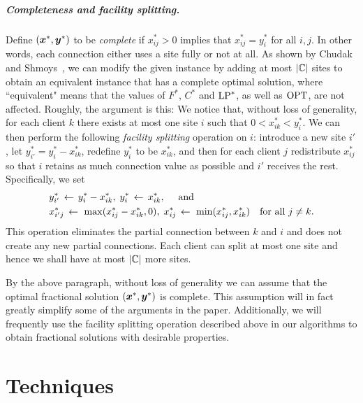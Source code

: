 \documentclass[oneside,final]{ucr}
\begin{document}
\paragraph{Completeness and facility splitting.}
Define $(\boldsymbol{x}^\ast, \boldsymbol{y}^\ast)$ to be \emph{complete} if
$x_{ij}^\ast>0$ implies that $x_{ij}^\ast=y_i^\ast$ for all $i,j$. In
other words, each connection either uses a site fully or not at all.
As shown by Chudak and Shmoys~\cite{ChudakS04}, we can modify the
given instance by adding at most $|\mathbb{C}|$ sites to obtain an
equivalent instance that has a complete optimal solution, where
``equivalent" means that the values of $F^\ast$, $C^\ast$ and
$\mbox{\rm LP}^\ast$, as well as $\mbox{\rm OPT}$, are not affected. Roughly, the argument
is this: We notice that, without loss of generality, for each client
$k$ there exists at most one site $i$ such that $0 < x_{ik}^\ast <
y_i^\ast$.  We can then perform the following \emph{facility
  splitting} operation on $i$: introduce a new site $i'$, let
$y^\ast_{i'} = y^\ast_i - x^\ast_{ik}$, redefine $y^\ast_i$ to be
$x^\ast_{ik}$, and then for each client $j$ redistribute $x^\ast_{ij}$
so that $i$ retains as much connection value as possible and $i'$
receives the rest. Specifically, we set
%
\begin{align*}
  &y^\ast_{i'} \;{\,\leftarrow\,}\; y^\ast_i - x^\ast_{ik},\;   y^\ast_{i} \;{\,\leftarrow\,}\; x^\ast_{ik}, \quad \text{ and }\\
  &x^\ast_{i'j} \;{\,\leftarrow\,}\;\max( x^\ast_{ij} - x^\ast_{ik}, 0 ),\;	 x^\ast_{ij} \;{\,\leftarrow\,}\; \min( x^\ast_{ij} , x^\ast_{ik}) 
			\quad	\textrm{for all}\ j \neq k.
\end{align*}
%
This operation eliminates the partial connection between $k$
and $i$ and does not create any new partial
connections. Each client can split at most one site and
hence we shall have at most $|\mathbb{C}|$ more sites.

By the above paragraph,  without loss of generality we can
assume that the optimal fractional solution $(\boldsymbol{x}^\ast, \boldsymbol{y}^\ast)$
is complete. This assumption will in fact greatly simplify some of
the arguments in the paper. Additionally, we will frequently use the facility
splitting operation described above in our algorithms to obtain fractional solutions with
desirable properties.


\chapter{Techniques} \label{ch: techniques} 
\end{document}
